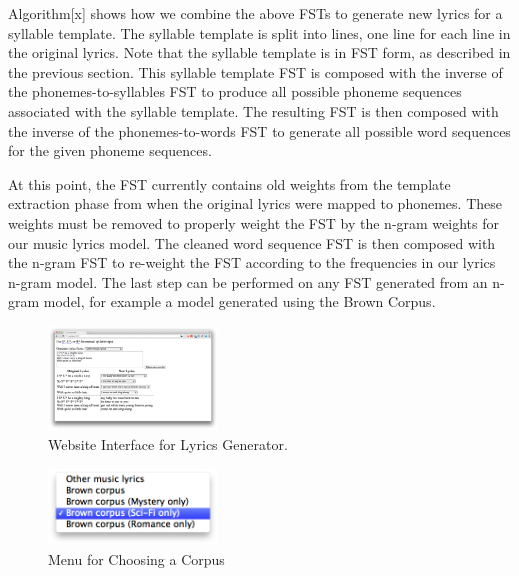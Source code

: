 \documentclass{vgtc}                          %
\begin{document}
Algorithm[x] shows how we combine the above FSTs to generate
new lyrics for a syllable template. The syllable template
is split into lines, one line for each line in the original
lyrics. Note that the syllable template is in FST form, as
described in the previous section. This syllable template
FST is composed with the inverse of the phonemes-to-syllables
FST to produce all possible phoneme sequences associated
with the syllable template. The resulting FST is then
composed with the inverse of the phonemes-to-words FST
to generate all possible word sequences for the given
phoneme sequences.

At this point, the FST currently contains
old weights from the template extraction phase from when
the original lyrics were mapped to phonemes. These weights
must be removed to properly weight the FST by the n-gram
weights for our music lyrics model. The cleaned word sequence FST
is then composed with the n-gram FST to re-weight
the FST according to the frequencies in our lyrics n-gram model.
The last step can be performed on any FST generated from an n-gram
model, for example a model generated using the Brown Corpus.

\begin{figure}%
\centering
\includegraphics[width=0.4\textwidth]{images/png/lion_king2.png}
\caption{Website Interface for Lyrics Generator.}
\label{fig:interface}
\end{figure}

\begin{figure}%
\centering
\includegraphics[width=0.4\textwidth]{images/png/choose_corpus.png}
\caption{Menu for Choosing a Corpus}
\label{fig:corpus-menu}
\end{figure}
\end{document}
